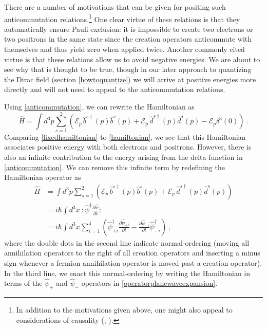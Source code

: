 \documentclass[12pt,secnumarabic,amsmath,amssymb,balancelastpage,nofootinbib]{article}
\begin{document}
There are a number of motivations that can be given for positing such anticommutation relations.\footnote{In addition to the motivations given above, one might also appeal to considerations of causality (\citealp[ch.\ 3]{peskinschroeder}; \citealp[sec.\ 5.5]{weinbergQFT}).}  One clear virtue of these relations is that they automatically ensure Pauli exclusion: it is impossible to create two electrons or two positrons in the same state since the creation operators anticommute with themselves and thus yield zero when applied twice.  Another commonly cited virtue is that these relations allow us to avoid negative energies.  We are about to see why that is thought to be true, though in our later approach to quantizing the Dirac field (section \ref{howtoquantize}) we will arrive at positive energies more directly and will not need to appeal to the anticommutation relations.


Using \eqref{anticommutation}, we can rewrite the Hamiltonian as
\begin{equation}
\widehat{H}=\int{d^3 p \sum_{s=1}^2  \left(\mathcal{E}_p\,\widehat{b}^{s\dagger}(p)\widehat{b}^s(p)+\mathcal{E}_p\,\widehat{d}^{s\dagger}(p)\widehat{d}^{s}(p)-\mathcal{E}_p \delta^3(0)\right)}
\ .
\label{fixedhamiltonian}
\end{equation}
Comparing \eqref{fixedhamiltonian} to \eqref{hamiltonian}, we see that this Hamiltonian associates positive energy with both electrons and positrons.  However, there is also an infinite contribution to the energy arising from the delta function in \eqref{anticommutation}.  We can remove this infinite term by redefining the Hamiltonian operator as
\begin{align}
\widehat{H}&=\int{d^3 p \sum_{s=1}^2 \left(\mathcal{E}_p\,\widehat{b}^{s\dagger}(p)\widehat{b}^s(p)+\mathcal{E}_p\,\widehat{d}^{s\dagger}(p)\widehat{d}^{s}(p)\right)}
\nonumber
\\
&=i \hbar \int{d^3 x \ :\widehat{\psi}^\dagger\frac{\partial \widehat{\psi}}{\partial t}:}
\nonumber
\\
&=i \hbar\int{d^3 x  \sum_{i=1}^4\left(\widehat{\psi}^{\dagger}_{+i}\frac{\partial \widehat{\psi}_{+i}}{\partial t}-\frac{\partial \widehat{\psi}_{-i}}{\partial t}\widehat{\psi}^{\dagger}_{-i} \right)}
\ ,
\label{fullyfixedhamiltonian}
\end{align}
where the double dots in the second line indicate normal-ordering (moving all annihilation operators to the right of all creation operators and inserting a minus sign whenever a fermion annihilation operator is moved past a creation operator).  In the third line, we enact this normal-ordering by writing the Hamiltonian in terms of the $\widehat{\psi}_{+}$ and $\widehat{\psi}_{-}$ operators in \eqref{operatorplanewaveexpansion}.
\end{document}
